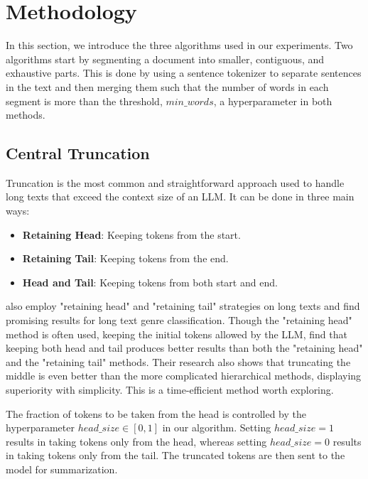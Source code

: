 \section{Methodology}
\label{sec:methodology}

In this section, we introduce the three algorithms used in our experiments.
Two algorithms start by segmenting a document into smaller, contiguous, and exhaustive parts.
This is done by using a sentence tokenizer to separate sentences in the text and then merging them such that the number of words in each segment is more than the threshold, $min\_words$, a hyperparameter in both methods.


\subsection{Central Truncation}
\label{method:truncation}

Truncation is the most common and straightforward approach used to handle long texts that exceed the context size of an LLM.
It can be done in three main ways:

\begin{itemize}
  \item \textbf{Retaining Head}: Keeping tokens from the start.
  \item \textbf{Retaining Tail}: Keeping tokens from the end.
  \item \textbf{Head and Tail}: Keeping tokens from both start and end.
\end{itemize}

\citet{worsham-kalita-2018-genre} also employ "retaining head" and "retaining tail" strategies on long texts and find promising results for long text genre classification.
Though the "retaining head" method is often used, keeping the initial tokens allowed by the LLM, \citet{sun2019fine} find that keeping both head and tail produces better results than both the "retaining head" and the "retaining tail" methods.
Their research also shows that truncating the middle is even better than the more complicated hierarchical methods, displaying superiority with simplicity.
This is a time-efficient method worth exploring.

The fraction of tokens to be taken from the head is controlled by the hyperparameter $head\_size \in [0, 1]$ in our algorithm.
Setting $head\_size = 1$ results in taking tokens only from the head, whereas setting $head\_size = 0$ results in taking tokens only from the tail.
The truncated tokens are then sent to the model for summarization.


